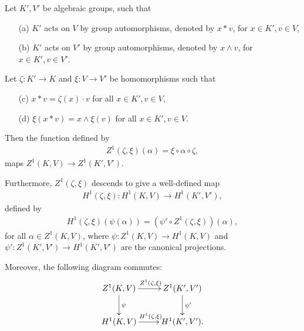 \begin{lemma} \label{h1maps} Let $K', V'$ be algebraic groups, such that
	\begin{itemize}
		\item[(a)] $K'$ acts on $V$ by group automorphisms, denoted by $x \ast v$, for $x \in K', v \in V$,
		\item[(b)] $K'$ acts on $V'$ by group automorphisms, denoted by $x \wedge v$, for $x \in K', v \in V'$.
	\end{itemize}
	Let $\zeta:K' \rightarrow K$ and $\xi: V \rightarrow V'$ be homomorphisms such that
	\begin{itemize}
		\item[(c)] $x \ast v = \zeta(x) \cdot v$ for all $x \in K', v \in V$,
		\item[(d)] $\xi(x \ast v) = x \wedge \xi(v)$ for all $x \in K', v \in V$.
	\end{itemize}
	Then the function defined by
	\begin{align*}
		Z^1(\zeta, \xi)(\alpha) = \xi \circ \alpha \circ \zeta,
	\end{align*}
	maps $Z^1(K, V) \rightarrow Z^1(K', V')$.

	Furthermore, $Z^1(\zeta, \xi)$ descends to give a well-defined map
	\begin{align*}
		H^1(\zeta, \xi):H^1(K, V) \rightarrow H^1(K', V'),
	\end{align*}
	defined by
	\begin{align*}
		H^1(\zeta, \xi)(\psi(\alpha)) = \left(\psi' \circ Z^1(\zeta, \xi)\right)(\alpha),
	\end{align*}
	for all $\alpha \in Z^1(K, V)$, where $\psi:Z^1(K, V)\rightarrow H^1(K, V)$ and $\psi':Z^1(K', V') \rightarrow H^1(K', V')$ are the canonical projections.

	Moreover, the following diagram commutes:
	\begin{align*}
		\xymatrix{
			Z^1(K, V) \ar[r]^{Z^1(\zeta, \xi)} \ar[d]^{\psi} & Z^1(K', V') \ar[d]^{\psi'} \\
			H^1(K, V) \ar[r]^{H^1(\zeta, \xi)}               & H^1(K', V').
		}
	\end{align*}
\end{lemma}
